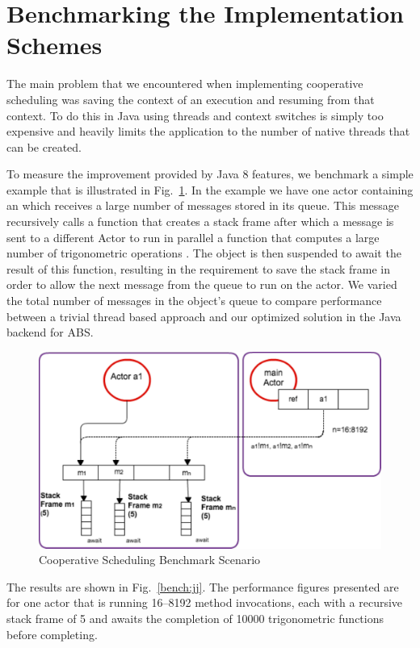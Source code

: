 \section{Benchmarking the Implementation Schemes}
\label{bench}
The main problem that we encountered  when implementing cooperative scheduling was saving the context of an execution and resuming from that context. To do this in Java using threads and context switches is simply too expensive and heavily limits the application to the number of native threads that can be created. 

To measure the improvement provided by Java 8 features, we benchmark a
simple example that is illustrated in Fig.~\ref{bench:sf}. In the
example we have one actor containing an  which receives a large
number of messages stored in its queue. This message recursively calls
a function that creates a stack frame after which a message is
sent to a different Actor to run in parallel a function that computes a large number of trigonometric operations . The object is then suspended to await the
result of this function, resulting in the requirement to save the stack frame in order to allow the next message from the queue to run
on the actor.  We varied the total number
of messages in the object's queue to compare performance between a trivial thread based approach and our optimized solution in the Java backend for ABS. 

\begin{figure}
	\label{bench:sf}
	\centering
	\includegraphics[scale=0.6]{scenario}
	\caption{Cooperative Scheduling Benchmark Scenario}
\end{figure}

\par The results are shown in
Fig.~\ref{bench:jj}. The performance figures presented are for one
actor that is running 16--8192 method invocations, each with a
recursive stack frame of 5 and awaits the
completion of 10000 trigonometric functions before completing. 



